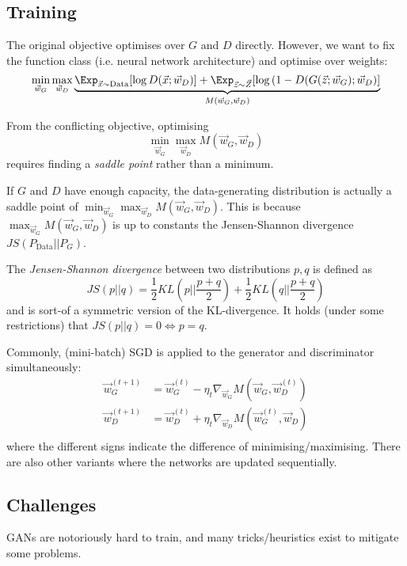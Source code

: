 \subsection{Training}
The original objective optimises over
$G$ and $D$ directly.
However, we want to fix the function class
(i.e. neural network architecture)
and optimise over weights:
\begin{equation*}
    \min_{\vec{w}_G}{\max_{\vec{w}_D}{
    \underbrace{
        \Exp_{\vec{x} \sim \text{Data}}[\log{D(\vec{x}; \vec{w}_D)}]
        +
        \Exp_{\vec{z} \sim \vec{Z}}[\log{(1 - D(G(\vec{z}; \vec{w}_G); \vec{w}_D)}]
    }_{M(\vec{w}_G, \vec{w}_D)}
    }}
\end{equation*}

From the conflicting objective,
optimising
\begin{equation*}
    \min_{\vec{w}_G}{\max_{\vec{w}_D}{
    M(\vec{w}_G, \vec{w}_D)
    }}
\end{equation*}
requires finding a \emph{saddle point}
rather than a minimum.

If $G$ and $D$ have enough capacity,
the data-generating distribution is
actually a saddle point of
$\min_{\vec{w}_G}{\max_{\vec{w}_D}{M(\vec{w}_G, \vec{w}_D)}}$.
This is because
$\max_{\vec{w}_G}{M(\vec{w}_G, \vec{w}_D)}$ is
up to constants the Jensen-Shannon divergence
$JS(P_\text{Data} || P_G)$.

The \emph{Jensen-Shannon divergence} between
two distributions $p, q$ is defined as
\begin{equation*}
    JS(p || q) =
    \frac{1}{2} KL(p || \frac{p+q}{2})
    +
    \frac{1}{2} KL(q || \frac{p+q}{2})
\end{equation*}
and is sort-of a symmetric version
of the KL-divergence.
It holds (under some restrictions) that
$JS(p || q) = 0 \Leftrightarrow p = q$.

Commonly, (mini-batch) SGD is applied to
the generator and discriminator simultaneously:
\begin{align*}
    \vec{w}_G^{(t+1)} &= \vec{w}_G^{(t)} - \eta_t \nabla_{\vec{w}_G} M(\vec{w}_G, \vec{w}_D^{(t)}) \\
    \vec{w}_D^{(t+1)} &= \vec{w}_D^{(t)} + \eta_t \nabla_{\vec{w}_D} M(\vec{w}_G^{(t)}, \vec{w}_D) \\
\end{align*}
where the different signs indicate the difference
of minimising/maximising.
There are also other variants where the
networks are updated sequentially.


\subsection{Challenges}
GANs are notoriously hard to train,
and many tricks/heuristics exist to
mitigate some problems.

